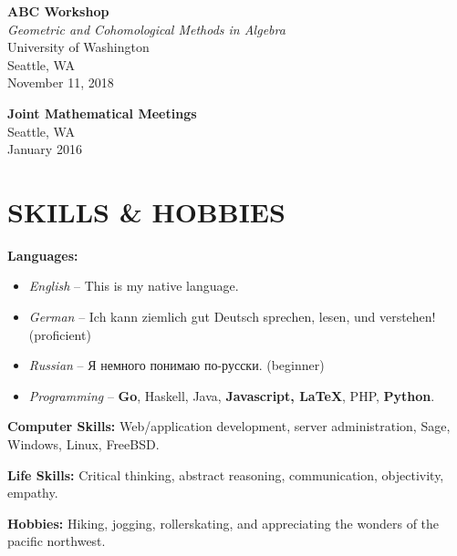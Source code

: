 \documentclass[margin]{res} %
\begin{document}
\begin{resume}
{\bf ABC Workshop}\\
{\sl Geometric and Cohomological Methods in Algebra}\\
University of Washington\\
Seattle, WA\\
November 11, 2018

{\bf Joint Mathematical Meetings}\\
Seattle, WA\\
January 2016


\section{SKILLS \& HOBBIES} 

{\bf Languages:}
\begin{itemize} \itemsep -2pt
	\item {\sl English} -- This is my native language.
	\item {\sl German} -- Ich kann ziemlich gut Deutsch sprechen, lesen, und verstehen! (proficient)
	\item {\sl Russian} -- \foreignlanguage{russian}{Я немного понимаю по-русски.} (beginner)
	\item {\sl Programming} -- {\bf Go}, Haskell, Java, {\bf Javascript, \LaTeX}, PHP, {\bf Python}.
\end{itemize}
{\bf Computer Skills:} Web/application development, server administration, Sage, Windows, Linux, FreeBSD.

{\bf Life Skills:} Critical thinking, abstract reasoning, communication, objectivity, empathy.

{\bf Hobbies:} Hiking, jogging, rollerskating, and appreciating the wonders of the pacific northwest.



\end{resume}
\end{document}
